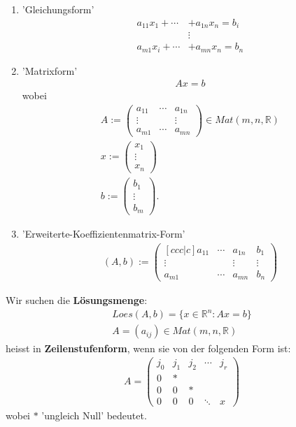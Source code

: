 \documentclass[11pt]{report}
\newcommand*\Zb[1] {\mathbb{#1}}
\newcommand*\f[1] {\textbf{#1}}
\begin{document}
\begin{enumerate}
 \item 'Gleichungsform'
\begin{align}
 a_{11} x_1 + \cdots & + a_{1n} x_n = b_i \\
                     & \vdots \\
 a_{m1} x_i + \cdots & + a_{mn} x_n = b_n
\end{align}
\item 'Matrixform'
\begin{align}
 Ax = b
\end{align}
wobei
\begin{align}
A := \begin{pmatrix} a_{11} & \cdots & a_{1n} \\ \vdots &  & \vdots \\ a_{m1} & \cdots & a_{mn} \end{pmatrix} \in Mat(m, n, \Zb{R}) \\
x := \begin{pmatrix} x_{1}  \\ \vdots  \\ x_{n} \end{pmatrix} \\
b := \begin{pmatrix} b_{1}  \\ \vdots  \\ b_{m} \end{pmatrix}.
\end{align}

\item 'Erweiterte-Koeffizientenmatrix-Form'
\begin{align}
(A, b) := \begin{pmatrix}[ccc|c] a_{11} & \cdots & a_{1n} & b_1 \\ \vdots &  & \vdots & \vdots \\ a_{m1} & \cdots & a_{mn} &b_n \end{pmatrix} 
\end{align}
\end{enumerate}

Wir suchen die \f{Lösungsmenge}: 
\begin{align}
 Loes(A,b) = \{ x \in \Zb{R}^n: Ax = b\} \\
 A=(a_{ij}) \in Mat(m, n, \Zb{R})
\end{align}
heisst in \f{Zeilenstufenform}, wenn sie von der folgenden Form ist:
\begin{align}
A = \begin{pmatrix} j_0 & j_1 & j_2 & \cdots & j_r \\ 0 & \ast & & & \\ 0 & 0 & \ast & & \\ 0 & 0 & 0 &\ddots & x \end{pmatrix}
\end{align}
wobei $\ast$ 'ungleich Null' bedeutet.
\end{document}
